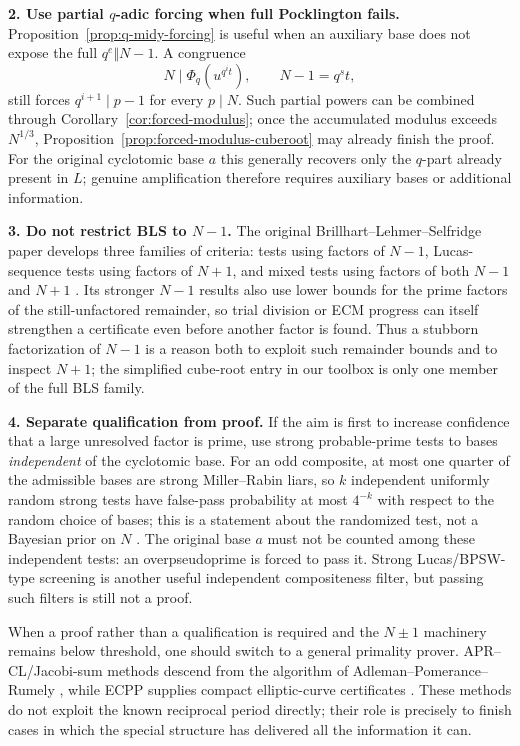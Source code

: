 \documentclass[11pt]{article}
\begin{document}
\medskip
\noindent\textbf{2. Use partial $q$-adic forcing when full Pocklington fails.}
Proposition~\ref{prop:q-midy-forcing} is useful when an auxiliary base does
not expose the full $q^e\Vert N-1$.  A congruence
\[
N\mid\Phi_q\!\left(u^{q^i t}\right),
\qquad N-1=q^s t,
\]
still forces $q^{i+1}\mid p-1$ for every $p\mid N$.  Such partial powers can
be combined through Corollary~\ref{cor:forced-modulus}; once the accumulated
modulus exceeds $N^{1/3}$, Proposition~\ref{prop:forced-modulus-cuberoot}
may already finish the proof.  For the original
cyclotomic base $a$ this generally recovers only the $q$-part already present
in $L$; genuine amplification therefore requires auxiliary bases or
additional information.

\medskip
\noindent\textbf{3. Do not restrict BLS to $N-1$.}
The original Brillhart--Lehmer--Selfridge paper develops three families of
criteria: tests using factors of $N-1$, Lucas-sequence tests using factors of
$N+1$, and mixed tests using factors of both $N-1$ and $N+1$
\cite{BLS1975}.  Its stronger $N-1$ results also use lower bounds for the
prime factors of the still-unfactored remainder, so trial division or ECM
progress can itself strengthen a certificate even before another factor is
found.  Thus a stubborn factorization of $N-1$ is a reason both to exploit
such remainder bounds and to inspect $N+1$; the simplified cube-root entry in
our toolbox is only one member of the full BLS family.

\medskip
\noindent\textbf{4. Separate qualification from proof.}
If the aim is first to increase confidence that a large unresolved factor is
prime, use strong probable-prime tests to bases \emph{independent} of the
cyclotomic base.  For an odd composite, at most one quarter of the admissible
bases are strong Miller--Rabin liars, so $k$ independent uniformly random
strong tests have false-pass probability at most $4^{-k}$ with respect to the
random choice of bases; this is a statement about the randomized test, not a
Bayesian prior on $N$ \cite{CrandallPomerance}.  The original base $a$ must
not be counted among these independent tests: an overpseudoprime is forced to
pass it.  Strong Lucas/BPSW-type screening is another useful independent
compositeness filter, but passing such filters is still not a proof.

When a proof rather than a qualification is required and the $N\pm1$
machinery remains below threshold, one should switch to a general primality
prover.  APR--CL/Jacobi-sum methods descend from the algorithm of
Adleman--Pomerance--Rumely \cite{APR1983,CohenLenstra1984}, while ECPP supplies
compact elliptic-curve certificates \cite{AtkinMorain1993}.  These methods do
not exploit the known reciprocal period directly; their role is precisely to
finish cases in which the special structure has delivered all the information
it can.
\end{document}
